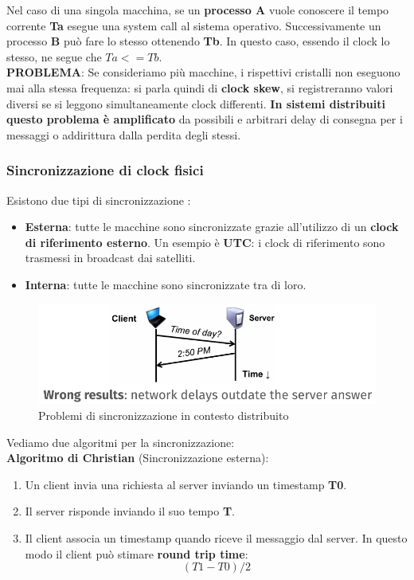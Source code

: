 \documentclass[12pt]{article}
\begin{document}
			Nel caso di una singola macchina, se un \textbf{processo A} vuole conoscere il tempo corrente \textbf{Ta} esegue una system call al sistema operativo. Successivamente un processo \textbf{B} può fare lo stesso ottenendo \textbf{Tb}. In questo caso, essendo il clock lo stesso, ne segue che $Ta<=Tb$.\\	 
			\textbf{PROBLEMA}:
			Se consideriamo più macchine, i rispettivi cristalli non eseguono mai alla stessa frequenza: si parla quindi di \textbf{clock skew}, si registreranno valori diversi se si leggono simultaneamente clock differenti. \textbf{In sistemi distribuiti questo problema è amplificato} da possibili e arbitrari delay di consegna per i messaggi o addirittura dalla perdita degli stessi.
		\subsubsection{Sincronizzazione di clock fisici}
			Esistono due tipi di sincronizzazione :
			\begin{itemize}
				\item \textbf{Esterna}: tutte le macchine sono sincronizzate grazie all'utilizzo di un \textbf{clock di riferimento esterno}. Un esempio è \textbf{UTC}: i clock di riferimento sono trasmessi in broadcast dai satelliti.
				\item \textbf{Interna}: tutte le macchine sono sincronizzate tra di loro.
			\end{itemize}
			\begin{figure}[h!]
				\centering
				\includegraphics[scale=0.35]{img/delay.png}
				\caption{Problemi di sincronizzazione in contesto distribuito}
			\end{figure}
			Vediamo due algoritmi per la sincronizzazione: \\
			\textbf{Algoritmo di Christian} (Sincronizzazione esterna):
			\begin{enumerate}
				\item Un client invia una richiesta al server inviando un timestamp \textbf{T0}.
				\item Il server risponde inviando il suo tempo \textbf{T}.
				\item Il client associa un timestamp quando riceve il messaggio dal server. In questo modo il client può stimare \textbf{round trip time}: $$(T1-T0)/2 $$
			\end{enumerate}
\end{document}
